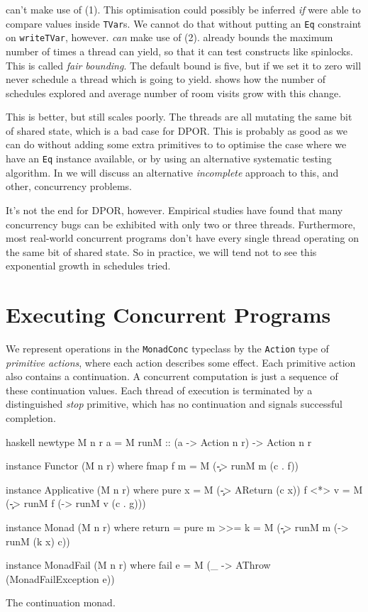 \dejafu{} can't make use of (1).  This optimisation could possibly be
inferred \emph{if} \dejafu{} were able to compare values inside
\verb|TVar|s.  We cannot do that without putting an \verb|Eq|
constraint on \verb|writeTVar|, however.  \dejafu{} \emph{can} make
use of (2).  \dejafu{} already bounds the maximum number of times a
thread can yield, so that it can test constructs like spinlocks.  This
is called \emph{fair bounding}.  The default bound is five, but if we
set it to zero \dejafu{} will never schedule a thread which is going
to yield.   shows how the number of schedules
explored and average number of room visits grow with this change.

This is better, but still scales poorly.  The threads are all mutating
the same bit of shared state, which is a bad case for DPOR.  This is
probably as good as we can do without adding some extra primitives to
\dejafu{} to optimise the case where we have an \verb|Eq| instance
available, or by using an alternative systematic testing algorithm.
In  we will discuss an alternative
\emph{incomplete} approach to this, and other, concurrency problems.

It's not the end for DPOR, however.  Empirical
studies\cite{thomson2014} have found that many concurrency bugs can be
exhibited with only two or three threads.  Furthermore, most
real-world concurrent programs don't have every single thread
operating on the same bit of shared state.  So in practice, we will
tend not to see this exponential growth in schedules tried.

\section{Executing Concurrent Programs}
\label{sec:dejafu-execution}

We represent operations in the \verb|MonadConc| typeclass by the
\verb|Action| type of \emph{primitive actions}, where each action
describes some effect.  Each primitive action also contains a
continuation.  A concurrent computation is just a sequence of these
continuation values.  Each thread of execution is terminated by a
distinguished \emph{stop} primitive, which has no continuation and
signals successful completion.

\begin{listing}
\centering
\begin{cminted}{haskell}
newtype M n r a = M { runM :: (a -> Action n r) -> Action n r }

instance Functor (M n r) where
  fmap f m = M (\c -> runM m (c . f))

instance Applicative (M n r) where
  pure x  = M (\c -> AReturn (c x))
  f <*> v = M (\c -> runM f (\g -> runM v (c . g)))

instance Monad (M n r) where
  return  = pure
  m >>= k = M (\c -> runM m (\x -> runM (k x) c))

instance MonadFail (M n r) where
  fail e = M (\_ -> AThrow (MonadFailException e))
\end{cminted}
\caption{The \dejafu{} continuation monad.}\label{lst:m}
\end{listing}

